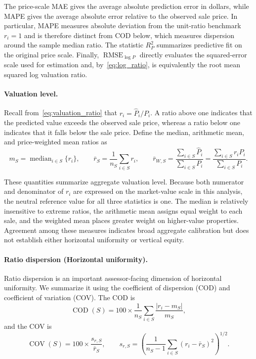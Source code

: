 \documentclass[10pt]{article}
\theoremstyle{definition}
\newcommand{\1}{\mathbf{1}}
\begin{document}
{The price-scale MAE gives the average absolute prediction error in dollars, while MAPE gives the average absolute error relative to the observed sale price. In particular, MAPE measures absolute deviation from the unit-ratio benchmark $r_i=1$ and is therefore distinct from COD below, which measures dispersion around the sample median ratio. The statistic $R^2_P$ summarizes predictive fit on the original price scale. Finally, $\operatorname{RMSE}_{\log P}$ directly evaluates the squared-error scale used for estimation and, by~\eqref{eq:log_ratio}, is equivalently the root mean squared log valuation ratio.}


\paragraph{Valuation level.}
Recall from~\eqref{eq:valuation_ratio} that $r_i=\widehat P_i/P_i$. A ratio above one indicates that the predicted value exceeds the observed sale price, whereas a ratio below one indicates that it falls below the sale price. Define the median, arithmetic mean, and price-weighted mean ratios as
\begin{equation}
\label{eq:level_ratios}
m_S
=
\operatorname{median}_{i\in S}\{r_i\},
\qquad
\bar r_S
=
\frac{1}{n_S}\sum_{i\in S}r_i,
\qquad
\bar r_{W,S}
=
\frac{\sum_{i\in S}\widehat P_i}{\sum_{i\in S}P_i}
=
\frac{\sum_{i\in S}r_iP_i}{\sum_{i\in S}P_i}.
\end{equation}


{These quantities summarize aggregate valuation level. Because both numerator and denominator of $r_i$ are expressed on the market-value scale in this analysis, the neutral reference value for all three statistics is one. The median is relatively insensitive to extreme ratios, the arithmetic mean assigns equal weight to each sale, and the weighted mean places greater weight on higher-value properties. Agreement among these measures indicates broad aggregate calibration but does not establish either horizontal uniformity or vertical equity.}


\paragraph{Ratio dispersion (Horizontal uniformity).}
Ratio dispersion is an important assessor-facing dimension of horizontal uniformity. We summarize it using the coefficient of dispersion (COD) and coefficient of variation (COV). The COD is
\begin{equation}
\label{eq:cod}
\operatorname{COD}(S)
=
100\times
\frac{1}{n_S}
\sum_{i\in S}
\frac{|r_i-m_S|}{m_S},
\end{equation}
and the COV is
\begin{equation}
\label{eq:cov}
\operatorname{COV}(S)
=
100\times
\frac{s_{r,S}}{\bar r_S},
\qquad
s_{r,S}
=
\left(
\frac{1}{n_S-1}
\sum_{i\in S}(r_i-\bar r_S)^2
\right)^{1/2}.
\end{equation}
\end{document}
